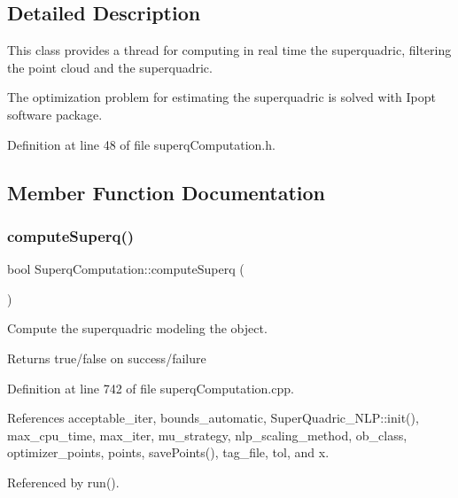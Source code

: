 \subsection{Detailed Description}
This class provides a thread for computing in real time the superquadric, filtering the point cloud and the superquadric. 

The optimization problem for estimating the superquadric is solved with Ipopt software package. 

Definition at line 48 of file superq\+Computation.\+h.



\subsection{Member Function Documentation}
\mbox{\label{classSuperqComputation_a99887a4fd19d25a3b1ebf46d63558397}} 
\subsubsection{\texorpdfstring{compute\+Superq()}{computeSuperq()}}
{\footnotesize\ttfamily bool Superq\+Computation\+::compute\+Superq (\begin{DoxyParamCaption}{ }\end{DoxyParamCaption})}



Compute the superquadric modeling the object. 

\begin{DoxyReturn}{Returns}
true/false on success/failure 
\end{DoxyReturn}


Definition at line 742 of file superq\+Computation.\+cpp.



References acceptable\+\_\+iter, bounds\+\_\+automatic, Super\+Quadric\+\_\+\+N\+L\+P\+::init(), max\+\_\+cpu\+\_\+time, max\+\_\+iter, mu\+\_\+strategy, nlp\+\_\+scaling\+\_\+method, ob\+\_\+class, optimizer\+\_\+points, points, save\+Points(), tag\+\_\+file, tol, and x.



Referenced by run().


